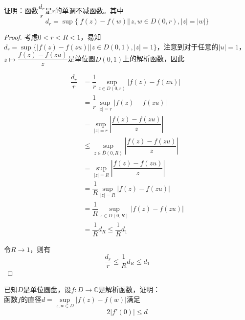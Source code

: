 \begin{proposition}

    证明：函数$\dfrac{d_r}{r}$是$r$的单调不减函数。其中
    $$d_r = \sup\{|f(z) - f(w)|\big| z,w \in D(0,r), |z| = |w|\}$$

\end{proposition}

\begin{proof}

    考虑$0 < r < R < 1$，易知$d_r = \sup\{|f(z) - f(zu)| \big| z \in D(0,1), |z| = 1 \}$，注意到对于任意的$|u| = 1$，$z \mapsto  \dfrac{f(z) - f(zu)}{z}$是单位圆$D(0,1)$上的解析函数，因此
    
    \begin{align*}
        \dfrac{d_r}{r} & = \dfrac{1}{r} \sup_{z \in D(0,r)}{|f(z) - f(zu)|} \\
        & = \dfrac{1}{r} \sup_{|z| = r}{|f(z) - f(zu)|} \\
        & = \sup_{|z| = r}{\left| \dfrac{f(z) - f(zu)}{z}\right|} \\
        & \leq \sup_{z \in \overline{D}(0,R)}{\left| \dfrac{f(z) - f(zu)}{z}\right|} \\
        & = \sup_{|z| = R}{\left| \dfrac{f(z) - f(zu)}{z}\right|} \\
        & = \dfrac{1}{R} \sup_{|z| = R}{|f(z) - f(zu)|} \\
        & = \dfrac{1}{R} \sup_{z \in D(0,R)}{|f(z) - f(zu)|} \\
        & = \dfrac{1}{R} d_{R} \leq \dfrac{1}{R} d_{1}
    \end{align*}

    令$R \to 1$，则有
    $$\dfrac{d_{r}}{r} \leq \dfrac{1}{R} d_{R} \leq d_1$$

\end{proof}

\begin{proposition}

    已知$D$是单位圆盘，设$f:D\to\mathbb{C}$是解析函数，证明：\\
    函数$f$的直径$d =\sup\limits_{z,w\in D}{|f(z) - f(w)|}$满足
    $$2|f'(0)| \leq d$$

\end{proposition}

